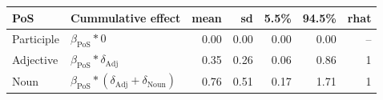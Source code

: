 
\begin{tabular}[t]{llrrrrr}
\toprule
PoS & Cummulative effect & mean & sd & 5.5\% & 94.5\% & rhat\\
\midrule
Participle & $\beta_{\text{PoS}} * 0$ & 0.00 & 0.00 & 0.00 & 0.00 & --\\
Adjective & $\beta_{\text{PoS}} * \delta_{\text{Adj}}$ & 0.35 & 0.26 & 0.06 & 0.86 & 1\\
Noun & $\beta_{\text{PoS}} * (\delta_{\text{Adj}} + \delta_{\text{Noun}})$ & 0.76 & 0.51 & 0.17 & 1.71 & 1\\
\bottomrule
\end{tabular}
